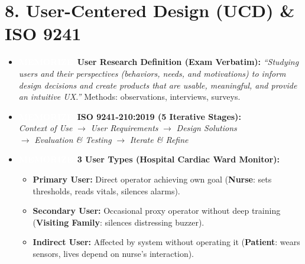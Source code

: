 \documentclass[8.5pt,a4paper,twocolumn]{article}
\newcommand{\tagmem}{\colorbox{accentred}{\textcolor{white}{\bfseries\fontsize{5.5pt}{6.5pt}\selectfont MEMORIZE}}\ }
\begin{document}
\section*{8. User-Centered Design (UCD) \& ISO 9241}
\begin{itemize}[leftmargin=7pt, itemsep=1pt, topsep=0.5pt]
    \item \tagmem \textbf{User Research Definition (Exam Verbatim):} \textit{``Studying users and their perspectives (behaviors, needs, and motivations) to inform design decisions and create products that are usable, meaningful, and provide an intuitive UX.''} Methods: observations, interviews, surveys.
    \item \tagmem \textbf{ISO 9241-210:2019 (5 Iterative Stages):}\\
    \textit{Context of Use} $\longrightarrow$ \textit{User Requirements} $\longrightarrow$ \textit{Design Solutions}\\
    $\longrightarrow$ \textit{Evaluation \& Testing} $\longrightarrow$ \textit{Iterate \& Refine}
    \item \tagmem \textbf{3 User Types (Hospital Cardiac Ward Monitor):}
    \begin{itemize}[leftmargin=6pt, itemsep=0.5pt]
        \item \textbf{Primary User:} Direct operator achieving own goal (\textbf{Nurse}: sets thresholds, reads vitals, silences alarms).
        \item \textbf{Secondary User:} Occasional proxy operator without deep training (\textbf{Visiting Family}: silences distressing buzzer).
        \item \textbf{Indirect User:} Affected by system without operating it (\textbf{Patient}: wears sensors, lives depend on nurse's interaction).
    \end{itemize}
\end{itemize}
\end{document}
